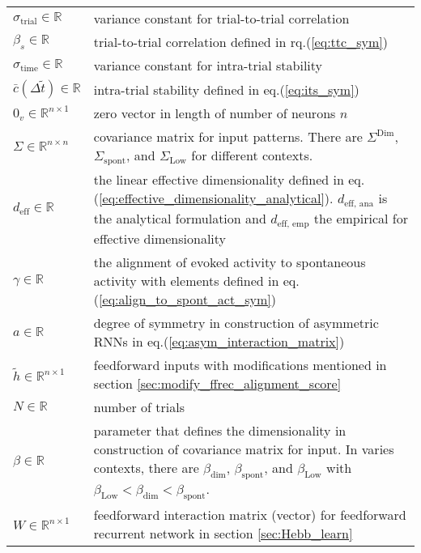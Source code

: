 \documentclass[11pt]{article}
\begin{document}
\begin{table}[H]
\begin{tabularx}{\textwidth}{lX}
			$\sigma_{\text{trial}} \in \mathbb{R}$ & variance constant for trial-to-trial correlation \\
			
			$\beta_s \in \mathbb{R}$ & trial-to-trial correlation defined in rq.(\ref{eq:ttc_sym}) \\
			
			$\sigma_{\text{time}} \in \mathbb{R}$ & variance constant for intra-trial stability \\
			
			$\bar{c}{(\Delta \tilde{t})} \in \mathbb{R}$ & intra-trial stability defined in eq.(\ref{eq:its_sym}) \\
			
			$0_v \in \mathbb{R}^{n \times 1}$ & zero vector in length of number of neurons $n$ \\
			
			$\Sigma \in \mathbb{R}^{n \times n}$ & covariance matrix for input patterns. There are $\Sigma^{\text{Dim}}$, $\Sigma_{\text{spont}}$, and $\Sigma_{\text{Low}}$ for different contexts.\\
			 
			$d_{\text{eff}} \in \mathbb{R}$ & the linear effective dimensionality defined in eq.(\ref{eq:effective_dimensionality_analytical}). $d_{\text{eff, ana}}$ is the analytical formulation and $d_{\text{eff, emp}}$ the empirical for effective dimensionality \\
			
			$\gamma \in \mathbb{R}$ & the alignment of evoked activity to spontaneous activity with elements defined in eq.(\ref{eq:align_to_spont_act_sym}) \\
			
			$a \in \mathbb{R}$ & degree of symmetry in construction of asymmetric RNNs in eq.(\ref{eq:asym_interaction_matrix}) \\
			
			$\tilde{h} \in \mathbb{R}^{n \times 1}$ & feedforward inputs with modifications mentioned in section \ref{sec:modify_ffrec_alignment_score} \\
			
			$N \in \mathbb{R}$ & number of trials \\
			
			$\beta \in \mathbb{R}$ & parameter that defines the dimensionality in construction of covariance matrix for input. In varies contexts, there are $\beta_{\text{dim}}$, $\beta_{\text{spont}}$, and $\beta_{\text{Low}}$ with $\beta_{\text{Low}} < \beta_{\text{dim}} < \beta_{\text{spont}}$.\\
			
			$W \in \mathbb{R}^{n \times 1}$ & feedforward interaction matrix (vector) for feedforward recurrent network in section \ref{sec:Hebb_learn} \\
		\end{tabularx}
	\end{table}
	
\end{document}
